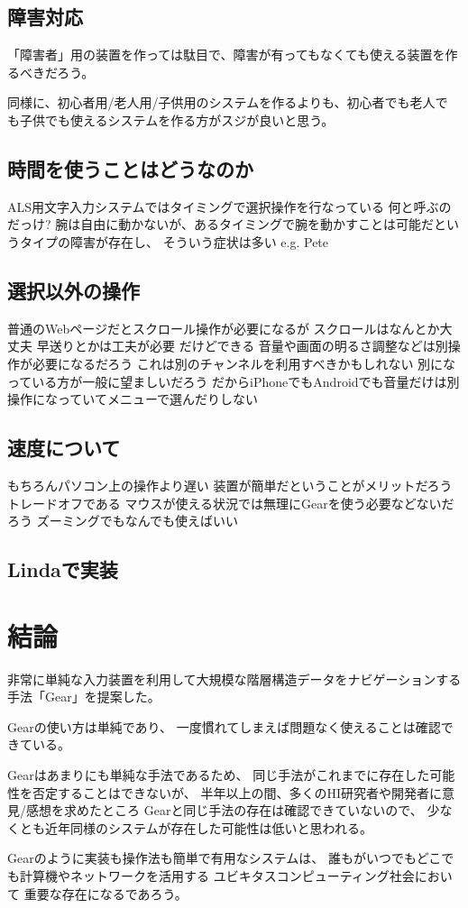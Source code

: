 \documentclass[twoside]{wiss}
\def\GEAR{\textsf{Gear}}
\begin{document}
\subsection{障害対応}

「障害者」用の装置を作っては駄目で、障害が有ってもなくても使える装置を作るべきだろう。

同様に、初心者用/老人用/子供用のシステムを作るよりも、初心者でも老人で
も子供でも使えるシステムを作る方がスジが良いと思う。

\subsection{時間を使うことはどうなのか}

ALS用文字入力システムではタイミングで選択操作を行なっている
  何と呼ぶのだっけ?
  腕は自由に動かないが、あるタイミングで腕を動かすことは可能だというタイプの障害が存在し、
    そういう症状は多い
e.g. Pete

\subsection{選択以外の操作}

普通のWebページだとスクロール操作が必要になるが
  スクロールはなんとか大丈夫
  早送りとかは工夫が必要
    だけどできる
音量や画面の明るさ調整などは別操作が必要になるだろう
     これは別のチャンネルを利用すべきかもしれない
     別になっている方が一般に望ましいだろう
       だからiPhoneでもAndroidでも音量だけは別操作になっていてメニューで選んだりしない

\subsection{速度について}
   もちろんパソコン上の操作より遅い
   装置が簡単だということがメリットだろう
     トレードオフである
   マウスが使える状況では無理に{\GEAR}を使う必要などないだろう
     ズーミングでもなんでも使えばいい

\subsection{Lindaで実装}

\section{結論}

非常に単純な入力装置を利用して大規模な階層構造データをナビゲーションする
手法「{\GEAR}」を提案した。

{\GEAR}の使い方は単純であり、
一度慣れてしまえば問題なく使えることは確認できている。

{\GEAR}はあまりにも単純な手法であるため、
同じ手法がこれまでに存在した可能性を否定することはできないが、
半年以上の間、多くのHI研究者や開発者に意見/感想を求めたところ
{\GEAR}と同じ手法の存在は確認できていないので、
少なくとも近年同様のシステムが存在した可能性は低いと思われる。

{\GEAR}のように実装も操作法も簡単で有用なシステムは、
誰もがいつでもどこでも計算機やネットワークを活用する
ユビキタスコンピューティング社会において
重要な存在になるであろう。

{\scriptsize


}
\end{document}
